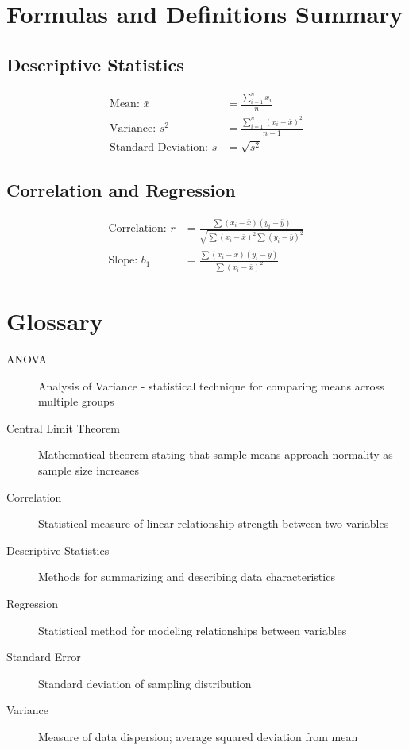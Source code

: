 \documentclass[12pt,a4paper]{book}
\begin{document}
\chapter{Formulas and Definitions Summary}

\section{Descriptive Statistics}

\begin{align}
\text{Mean: } \bar{x} &= \frac{\sum_{i=1}^{n} x_i}{n}\\
\text{Variance: } s^2 &= \frac{\sum_{i=1}^{n} (x_i - \bar{x})^2}{n-1}\\
\text{Standard Deviation: } s &= \sqrt{s^2}
\end{align}

\section{Correlation and Regression}

\begin{align}
\text{Correlation: } r &= \frac{\sum(x_i - \bar{x})(y_i - \bar{y})}{\sqrt{\sum(x_i - \bar{x})^2 \sum(y_i - \bar{y})^2}}\\
\text{Slope: } b_1 &= \frac{\sum(x_i - \bar{x})(y_i - \bar{y})}{\sum(x_i - \bar{x})^2}
\end{align}

\chapter{Glossary}

\begin{description}
    \item[ANOVA] Analysis of Variance - statistical technique for comparing means across multiple groups
    \item[Central Limit Theorem] Mathematical theorem stating that sample means approach normality as sample size increases
    \item[Correlation] Statistical measure of linear relationship strength between two variables
    \item[Descriptive Statistics] Methods for summarizing and describing data characteristics
    \item[Regression] Statistical method for modeling relationships between variables
    \item[Standard Error] Standard deviation of sampling distribution
    \item[Variance] Measure of data dispersion; average squared deviation from mean
\end{description}
\end{document}
